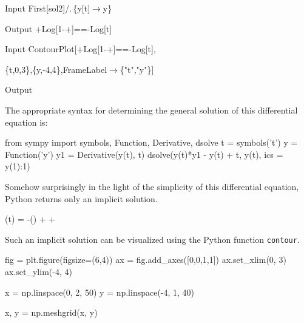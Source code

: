 \begin{example}
\begin{mdframed}[default,backgroundcolor=gray!40,roundcorner=8pt]
\begin{mmaCell}[moredefined={sol2}]{Input}
  First[sol2]/.\(\pmb{\,}\)\{y[t]\(\pmb{\to}\)y\}
\end{mmaCell}

\begin{mmaCell}{Output}
  +Log[1-+]==-Log[t]
\end{mmaCell}

\begin{mmaCell}[morefunctionlocal={y, t}]{Input}
  ContourPlot[+Log[1-+]==-Log[t],

	 \{t,0,3\},\{y,-4,4\},FrameLabel\(\pmb{\to}\)\{"t","y"\}]
\end{mmaCell}

\begin{mmaCell}[moregraphics={moreig={scale=.4}}]{Output}
\end{mmaCell}
\end{mdframed}
\fi

\ifpython
The appropriate syntax for determining the general solution of this differential equation is: 
\begin{pyin}
from sympy import symbols, Function, Derivative, dsolve
t = symbols('t')
y = Function('y')
y1 = Derivative(y(t), t)
dsolve(y(t)*y1 - y(t) + t, y(t), ics = {y(1):1})
\end{pyin}
Somehow surprisingly in the light of the simplicity of this differential equation, Python returns only an implicit solution. 
\begin{pyout}
\log(t) = -\log\left(\right) +  + 
\end{pyout}
Such an implicit solution can be visualized using the Python function \lstinline{contour}.
\begin{pyin}
fig = plt.figure(figsize=(6,4))
ax = fig.add_axes([0,0,1,1])
ax.set_xlim(0, 3)
ax.set_ylim(-4, 4)

x = np.linspace(0, 2, 50)
y = np.linspace(-4, 1, 40)

x, y = np.meshgrid(x, y)


\end{pyin}
\end{example}
